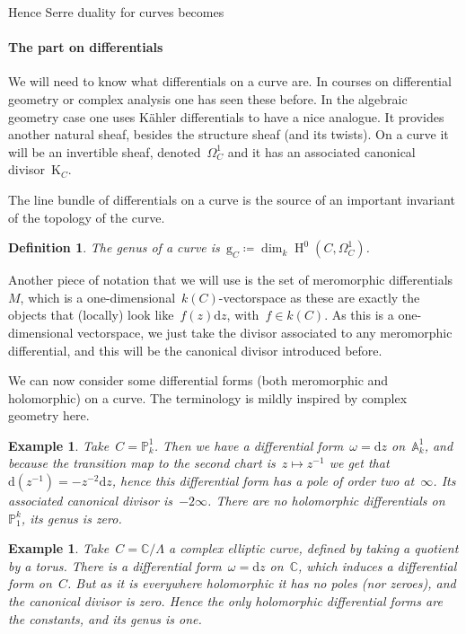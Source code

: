 \documentclass[10pt,a4paper]{article}
\theoremstyle{lecture}
\newtheorem{definition}[theorem]{Definition}
\newtheorem{example}[theorem]{Example}
\newcommand\dash{\nobreakdash-\hspace{0pt}}
\newcommand\dd{\mathrm{d}}
\DeclareMathOperator\HH{H}
\begin{document}
Hence Serre duality for curves becomes\expand

\paragraph{The part on differentials}
We will need to know what differentials on a curve are. In courses on differential geometry or complex analysis one has seen these before. In the algebraic geometry case one uses K\"ahler differentials to have a nice analogue. It provides another natural sheaf, besides the structure sheaf (and its twists). On a curve it will be an invertible sheaf, denoted~$\Omega_C^1$ and it has an associated canonical divisor~$\mathrm{K}_C$.

The line bundle of differentials on a curve is the source of an important invariant of the topology of the curve.
\begin{definition}
  The \emph{genus} of a curve is~$\mathrm{g}_C\coloneqq\dim_k\HH^0(C,\Omega_C^1)$.
\end{definition}
Another piece of notation that we will use is the set of meromorphic differentials~$M$, which is a one-dimensional~$k(C)$\dash vectorspace as these are exactly the objects that (locally) look like~$f(z)\dd z$, with~$f\in k(C)$. As this is a one-dimensional vectorspace, we just take the divisor associated to any meromorphic differential, and this will be the canonical divisor introduced before.

We can now consider some differential forms (both meromorphic and holomorphic) on a curve. The terminology is mildly inspired by complex geometry here.
\begin{example}
  Take~$C=\mathbb{P}_k^1$. Then we have a differential form~$\omega=\dd z$ on~$\mathbb{A}_k^1$, and because the transition map to the second chart is~$z\mapsto z^{-1}$ we get that~$\dd(z^{-1})=-z^{-2}\dd z$, hence this differential form has a pole of order two at~$\infty$. Its associated canonical divisor is~$-2\infty$. There are no holomorphic differentials on~$\mathbb{P}_1^k$, its genus is zero.
\end{example}
\begin{example}
  Take~$C=\mathbb{C}/\Lambda$ a complex elliptic curve, defined by taking a quotient by a torus. There is a differential form~$\omega=\dd z$ on~$\mathbb{C}$, which induces a differential form on~$C$. But as it is everywhere holomorphic it has no poles (nor zeroes), and the canonical divisor is zero. Hence the only holomorphic differential forms are the constants, and its genus is one.
\end{example}
\end{document}
